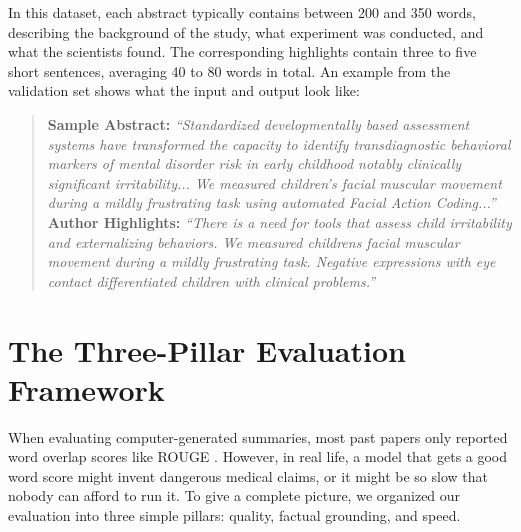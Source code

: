 \documentclass[11pt,a4paper]{article}
\begin{document}
In this dataset, each abstract typically contains between 200 and 350 words, describing the background of the study, what experiment was conducted, and what the scientists found. The corresponding highlights contain three to five short sentences, averaging 40 to 80 words in total. An example from the validation set shows what the input and output look like:
\begin{quote}
    \small
    \textbf{Sample Abstract:} \textit{``Standardized developmentally based assessment systems have transformed the capacity to identify transdiagnostic behavioral markers of mental disorder risk in early childhood notably clinically significant irritability... We measured children's facial muscular movement during a mildly frustrating task using automated Facial Action Coding...''}\\
    \textbf{Author Highlights:} \textit{``There is a need for tools that assess child irritability and externalizing behaviors. We measured childrens facial muscular movement during a mildly frustrating task. Negative expressions with eye contact differentiated children with clinical problems.''}
\end{quote}

\section{The Three-Pillar Evaluation Framework}
\label{sec:framework}
When evaluating computer-generated summaries, most past papers only reported word overlap scores like ROUGE \cite{lin2004rouge}. However, in real life, a model that gets a good word score might invent dangerous medical claims, or it might be so slow that nobody can afford to run it. To give a complete picture, we organized our evaluation into three simple pillars: quality, factual grounding, and speed.
\end{document}
